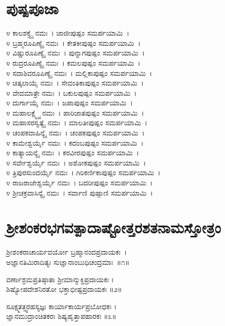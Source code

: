 \section{ಪುಷ್ಪಪೂಜಾ}
೪ ಕಾಲಶಕ್ತ್ಯೈ ನಮಃ~। ಜಾಜೀಪುಷ್ಪಂ ಸಮರ್ಪಯಾಮಿ~।\\
೪ ಬ್ರಹ್ಮರೂಪಿಣ್ಯೈ ನಮಃ~। ಕೇತಕೀಪುಷ್ಪಂ ಸಮರ್ಪಯಾಮಿ~।\\
೪ ವಿಷ್ಣುರೂಪಿಣ್ಯೈ ನಮಃ~। ಪುನ್ನಾಗಪುಷ್ಪಂ ಸಮರ್ಪಯಾಮಿ~।\\
೪ ರುದ್ರರೂಪಿಣ್ಯೈ ನಮಃ~। ಕಮಲಪುಷ್ಪಂ ಸಮರ್ಪಯಾಮಿ~।\\
೪ ಸದಾಶಿವರೂಪಿಣ್ಯೈ ನಮಃ~। ಮಲ್ಲಿಕಾಪುಷ್ಪಂ ಸಮರ್ಪಯಾಮಿ~।\\
೪ ಚಿತ್ಕಲಾಯೈ ನಮಃ~। ಸೇವಂತಿಕಾಪುಷ್ಪಂ ಸಮರ್ಪಯಾಮಿ~।\\
೪ ವೇದಮಾತ್ರೇ ನಮಃ~। ಬಕುಲಪುಷ್ಪಂ ಸಮರ್ಪಯಾಮಿ~।\\
೪ ದುರ್ಗಾಯೈ ನಮಃ~। ಜಪಾಪುಷ್ಪಂ ಸಮರ್ಪಯಾಮಿ~।\\
೪ ಮಹಾಲಕ್ಷ್ಮ್ಯೈ ನಮಃ~। ಪಾರಿಜಾತಪುಷ್ಪಂ ಸಮರ್ಪಯಾಮಿ~।\\
೪ ಮಹಾಸರಸ್ವತ್ಯೈ ನಮಃ~। ಮಾಲತೀಪುಷ್ಪಂ ಸಮರ್ಪಯಾಮಿ~।\\
೪ ಚಂಪಕವಾಹಿನ್ಯೈ ನಮಃ~। ಚಂಪಕಪುಷ್ಪಂ ಸಮರ್ಪಯಾಮಿ~।\\
೪ ಕಾಮೇಶ್ವರ್ಯೈ ನಮಃ~। ಕದಂಬಪುಷ್ಪಂ ಸಮರ್ಪಯಾಮಿ~।\\
೪ ಕಾತ್ಯಾಯನ್ಯೈ ನಮಃ~। ಕರವೀರಪುಷ್ಪಂ ಸಮರ್ಪಯಾಮಿ~।\\
೪ ಸರ್ವೇಶ್ವರ್ಯೈ ನಮಃ~। ಅಶೋಕಪುಷ್ಪಂ ಸಮರ್ಪಯಾಮಿ~।\\
೪ ತ್ರಿಪುರಸುಂದರ್ಯೈ ನಮಃ~। ಗಿರಿಕರ್ಣಿಕಾಪುಷ್ಪಂ ಸಮರ್ಪಯಾಮಿ~।\\
೪ ರಾಜರಾಜೇಶ್ವರ್ಯೈ ನಮಃ~। ಬದರೀಪುಷ್ಪಂ ಸಮರ್ಪಯಾಮಿ~।\\
೪ ಶ್ರೀಚಕ್ರವಾಸಿನ್ಯೈ ನಮಃ~। ಸರ್ವಾಣಿ ಪುಷ್ಪಾಣಿ ಸಮರ್ಪಯಾಮಿ~।

\section{ ಶ್ರೀಶಂಕರಭಗವತ್ಪಾದಾಷ್ಟೋತ್ತರಶತನಾಮಸ್ತೋತ್ರಂ}

ಶ್ರೀಶಂಕರಾಚಾರ್ಯವರ್ಯೋ  ಬ್ರಹ್ಮಾನಂದಪ್ರದಾಯಕಃ~।\\
ಅಜ್ಞಾನತಿಮಿರಾದಿತ್ಯಃ  ಸುಜ್ಞಾನಾಂಬುಧಿಚಂದ್ರಮಾಃ~॥೧॥

ವರ್ಣಾಶ್ರಮಪ್ರತಿಷ್ಠಾತಾ  ಶ್ರೀಮಾನ್ಮುಕ್ತಿಪ್ರದಾಯಕಃ ।\\
ಶಿಷ್ಯೋಪದೇಶನಿರತೋ ಭಕ್ತಾಭೀಷ್ಟಪ್ರದಾಯಕಃ ॥೨॥

ಸೂಕ್ಷ್ಮತತ್ತ್ವರಹಸ್ಯಜ್ಞಃ ಕಾರ್ಯಾಕಾರ್ಯಪ್ರಬೋಧಕಃ ।\\
ಜ್ಞಾನಮುದ್ರಾಂಚಿತಕರಃ  ಶಿಷ್ಯಹೃತ್ತಾಪಹಾರಕಃ ॥೩॥

